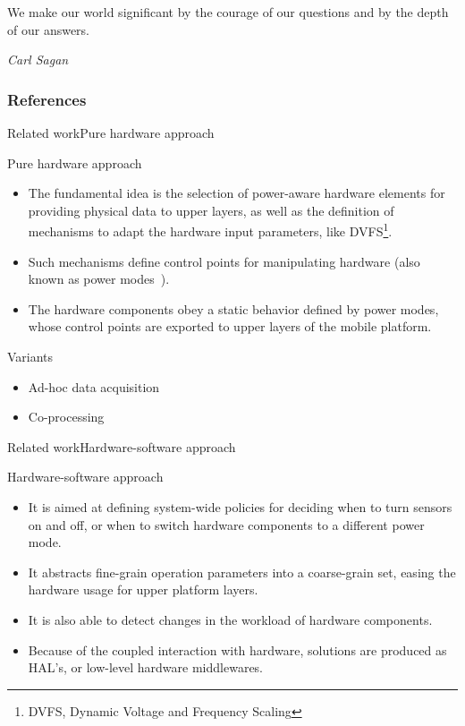 \documentclass[8pt,xcolor={dvipsnames},handout]{beamer}
\begin{document}
{\aauwavesbg
\begin{frame}
  { \tiny
    \epigraph{\tiny We make our world significant by the courage of our questions and by the depth of our answers.}{\tiny \textit{Carl Sagan}}
  }
\end{frame}}

\begin{frame}[allowframebreaks]
        \frametitle{References}
%
{
\tiny{}


}
\end{frame}

\begin{frame}{Related work}{Pure hardware approach}
\begin{exampleblock}{Pure hardware approach}
\begin{itemize}
  \item The fundamental idea is the selection of power-aware hardware elements for providing physical data to upper layers, as well as the definition of mechanisms to adapt the hardware input parameters, like DVFS\footnote{DVFS, Dynamic Voltage and Frequency Scaling}.
  \item Such mechanisms define control points for manipulating hardware (also known as power modes~\cite{Ranganathan2010,Lorch1998,Benini2000}).
  \item The hardware components obey a static behavior defined by power modes, whose control points are exported to upper layers of the mobile platform.
\end{itemize}
\end{exampleblock}

\begin{exampleblock}{Variants}
\begin{itemize}
  \item Ad-hoc data acquisition
  \item Co-processing
\end{itemize}
\end{exampleblock}
\end{frame}

\begin{frame}{Related work}{Hardware-software approach}
\begin{exampleblock}{Hardware-software approach}
\begin{itemize}
  \item It is aimed at defining system-wide policies for deciding when to turn sensors on and off, or when to switch hardware components to a different power mode.
  \item It abstracts fine-grain operation parameters into a coarse-grain set, easing the hardware usage for upper platform layers.
  \item It is also able to detect changes in the workload of hardware components.
  \item Because of the coupled interaction with hardware, solutions are produced as HAL's, or low-level hardware middlewares.
\end{itemize}
\end{exampleblock}
\end{frame}
\end{document}
